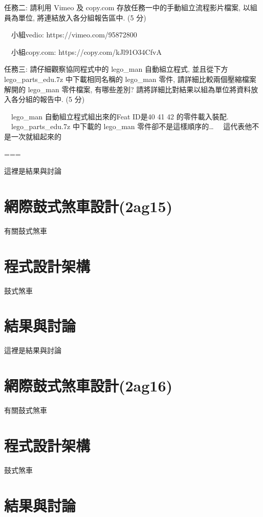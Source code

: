 \documentclass[]{article}
\begin{document}
任務二: 請利用 Vimeo 及 copy.com 存放任務一中的手動組立流程影片檔案,
以組員為單位, 將連結放入各分組報告區中. (5 分)

　小組vedio: https://vimeo.com/95872800

　小組copy.com: https://copy.com/kJl91O34CfvA

任務三: 請仔細觀察協同程式中的 lego\_man 自動組立程式, 並且從下方
lego\_parts\_edu.7z 中下載相同名稱的 lego\_man 零件,
請詳細比較兩個壓縮檔案解開的 lego\_man 零件檔案, 有哪些差別?
請將詳細比對結果以組為單位將資料放入各分組的報告中. (5 分)

　lego\_man 自動組立程式組出來的Feat ID是40 41 42 的零件載入裝配.
　lego\_parts\_edu.7z 中下載的 lego\_man 零件卻不是這樣順序的\ldots{}
　這代表他不是一次就組起來的

===

這裡是結果與討論

\section{網際鼓式煞車設計(2ag15)}\label{ux7db2ux969bux9f13ux5f0fux715eux8ecaux8a2dux8a082ag15}

有關鼓式煞車

\section{程式設計架構}\label{ux7a0bux5f0fux8a2dux8a08ux67b6ux69cb-4}

鼓式煞車

\section{結果與討論}\label{ux7d50ux679cux8207ux8a0eux8ad6-4}

這裡是結果與討論

\section{網際鼓式煞車設計(2ag16)}\label{ux7db2ux969bux9f13ux5f0fux715eux8ecaux8a2dux8a082ag16}

有關鼓式煞車

\section{程式設計架構}\label{ux7a0bux5f0fux8a2dux8a08ux67b6ux69cb-5}

鼓式煞車

\section{結果與討論}\label{ux7d50ux679cux8207ux8a0eux8ad6-5}
\end{document}
